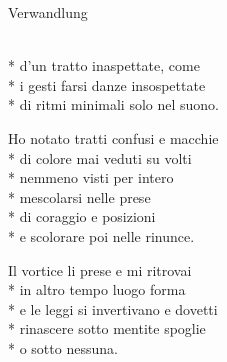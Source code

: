 \documentclass[12pt]{book}
\begin{document}
\begin{poem}{Verwandlung}{}

\settowidth{\versewidth}{non meno è ciò che meriti.}


\begin{altverse}
\\*
d'un tratto inaspettate, come \\*
i gesti farsi danze insospettate \\*
di ritmi minimali solo nel suono. 
\end{altverse}

\begin{altverse}
Ho notato tratti confusi e macchie\\*
di colore mai veduti su volti\\*
nemmeno visti per intero\\*
mescolarsi nelle prese\\*
di coraggio e posizioni\\*
e scolorare poi nelle rinunce.
\end{altverse}

\begin{altverse}
Il vortice li prese e mi ritrovai\\*
in altro tempo luogo forma\\*
e le leggi si invertivano e dovetti\\*
rinascere sotto mentite spoglie\\*
o sotto nessuna.
\end{altverse}

\end{poem}
\end{document}
